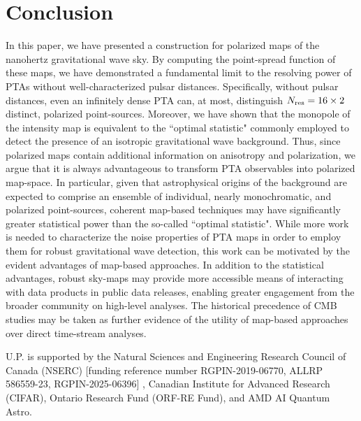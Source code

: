 \documentclass[%
 reprint,
nofootinbib,
 amsmath,amssymb,
 aps,
]{revtex4-2}
\begin{document}
\section{Conclusion}
In this paper, we have presented a construction for polarized maps of the nanohertz gravitational wave sky. By computing the point-spread function of these maps, we have demonstrated a fundamental limit to the resolving power of PTAs without well-characterized pulsar distances. Specifically, without pulsar distances, even an infinitely dense PTA can, at most, distinguish $N_{\rm res} = 16 \times 2$ distinct, polarized point-sources. Moreover, we have shown that the monopole of the intensity map is equivalent to the ``optimal statistic" commonly employed to detect the presence of an isotropic gravitational wave background. Thus, since polarized maps contain additional information on anisotropy and polarization, we argue that it is always advantageous to transform PTA observables into polarized map-space. In particular, given that astrophysical origins of the background are expected to comprise an ensemble of individual, nearly monochromatic, and polarized point-sources, coherent map-based techniques may have significantly greater statistical power than the so-called ``optimal statistic". While more work is needed to characterize the noise properties of PTA maps in order to employ them for robust gravitational wave detection, this work can be motivated by the evident advantages of map-based approaches. In addition to the statistical advantages, robust sky-maps may provide more accessible means of interacting with data products in public data releases, enabling greater engagement from the broader community on high-level analyses. The historical precedence of CMB studies may be taken as further evidence of the utility of map-based approaches over direct time-stream analyses. 

\begin{acknowledgments}
U.P. is supported by the Natural Sciences and Engineering Research Council of Canada (NSERC) [funding reference number RGPIN-2019-06770, ALLRP 586559-23, RGPIN-2025-06396] , Canadian Institute for Advanced Research (CIFAR), Ontario Research Fund (ORF-RE Fund), and AMD AI Quantum Astro.
\end{acknowledgments}

\appendix


\nocite{*}

\end{document}
